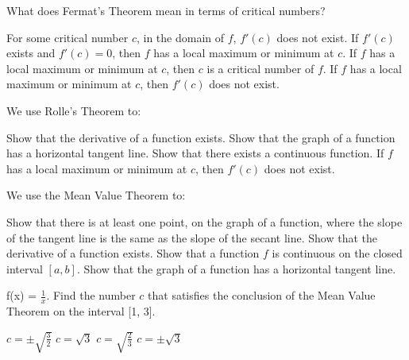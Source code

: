 \documentclass[addpoints, 12pt]{exam}%
\newcommand{\spc}{\vspace*{0.5cm}}
\begin{document}
\begin{questions}
\question[1]

What does Fermat's Theorem mean in terms of critical numbers?

\begin{choices}
\choice For some critical number $c$, in the domain of $f$, $f'(c)$ does not exist.
\choice If $f'(c)$ exists and $f'(c) = 0$, then $f$ has a local maximum or minimum at $c$.
\CorrectChoice If $f$ has a local maximum or minimum at $c$, then $c$ is a critical number of $f$.
\choice If $f$ has a local maximum or minimum at $c$, then $f'(c)$ does not exist.
\end{choices}

\spc

\question[1]

We use Rolle's Theorem to:

\begin{choices}
\choice Show that the derivative of a function exists.
\CorrectChoice Show that the graph of a function has a horizontal tangent line. 
\choice Show that there exists a continuous function. 
\choice If $f$ has a local maximum or minimum at $c$, then $f'(c)$ does not exist.
\end{choices}

\spc

\question[1]

We use the Mean Value Theorem to:

\begin{choices}
\CorrectChoice Show that there is at least one point, on the graph of a function, where the slope of the tangent line is the same as the slope of the secant line.
\choice Show that the derivative of a function exists.
\choice Show that a function $f$ is continuous on the closed interval $[a, b]$.
\choice Show that the graph of a function has a horizontal tangent line. 
\end{choices}

\question[1]

f(x) = $\frac{1}{x}$. Find the number $c$ that satisfies the conclusion of the Mean Value Theorem on the interval [1, 3].

\begin{multicols}{2}
\begin{choices}
\choice $c = \pm\sqrt{\frac{3}{2}}$
\CorrectChoice $c = \sqrt{3}$
\choice $c = \sqrt{\frac{2}{3}}$
\choice $c = \pm\sqrt{3}$
\end{choices}
\end{multicols}


\question[1]


\end{questions}
\end{document}
